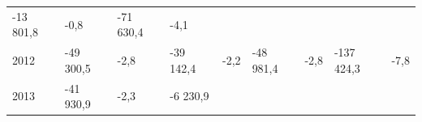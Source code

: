 \begin{longtable}[]{@{}lllllllll@{}}
\begin{minipage}[t]{0.12\columnwidth}
-13 801,8\strut
\end{minipage} & \begin{minipage}[t]{0.06\columnwidth}\raggedright
-0,8\strut
\end{minipage} & \begin{minipage}[t]{0.09\columnwidth}\raggedright
-71 630,4\strut
\end{minipage} & \begin{minipage}[t]{0.06\columnwidth}\raggedright
-4,1\strut
\end{minipage}\tabularnewline
\begin{minipage}[t]{0.05\columnwidth}\raggedright
2012\strut
\end{minipage} & \begin{minipage}[t]{0.10\columnwidth}\raggedright
-49 300,5\strut
\end{minipage} & \begin{minipage}[t]{0.06\columnwidth}\raggedright
-2,8\strut
\end{minipage} & \begin{minipage}[t]{0.16\columnwidth}\raggedright
-39 142,4\strut
\end{minipage} & \begin{minipage}[t]{0.06\columnwidth}\raggedright
-2,2\strut
\end{minipage} & \begin{minipage}[t]{0.12\columnwidth}\raggedright
-48 981,4\strut
\end{minipage} & \begin{minipage}[t]{0.06\columnwidth}\raggedright
-2,8\strut
\end{minipage} & \begin{minipage}[t]{0.09\columnwidth}\raggedright
-137 424,3\strut
\end{minipage} & \begin{minipage}[t]{0.06\columnwidth}\raggedright
-7,8\strut
\end{minipage}\tabularnewline
\begin{minipage}[t]{0.05\columnwidth}\raggedright
2013\strut
\end{minipage} & \begin{minipage}[t]{0.10\columnwidth}\raggedright
-41 930,9\strut
\end{minipage} & \begin{minipage}[t]{0.06\columnwidth}\raggedright
-2,3\strut
\end{minipage} & \begin{minipage}[t]{0.16\columnwidth}\raggedright
-6 230,9\strut

\end{minipage}
\end{longtable}
